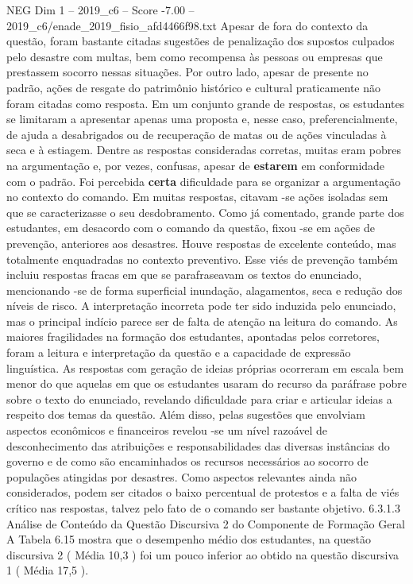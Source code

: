 \begin{textsample}{NEG Dim 1 – 2019\_c6 – Score -7.00 – 2019\_c6/enade\_2019\_fisio\_afd4466f98.txt}
Apesar de fora do contexto da questão, foram bastante citadas sugestões de penalização dos supostos culpados pelo desastre com multas, bem como recompensa às pessoas ou empresas que prestassem socorro nessas situações.
Por outro lado, apesar de presente no padrão, ações de resgate do patrimônio histórico e cultural praticamente não foram citadas como resposta.
Em um conjunto grande de respostas, os estudantes se limitaram a apresentar apenas uma proposta e, nesse caso, preferencialmente, de ajuda a desabrigados ou de recuperação de matas ou de ações vinculadas à seca e à estiagem.
Dentre as respostas consideradas corretas, muitas eram pobres na argumentação e, por vezes, confusas, apesar de \textbf{estarem} em conformidade com o padrão.
Foi percebida \textbf{certa} dificuldade para se organizar a argumentação no contexto do comando.
Em muitas respostas, citavam -se ações isoladas sem que se caracterizasse o seu desdobramento.
Como já comentado, grande parte dos estudantes, em desacordo com o comando da questão, fixou -se em ações de prevenção, anteriores aos desastres.
Houve respostas de excelente conteúdo, mas totalmente enquadradas no contexto preventivo.
Esse viés de prevenção também incluiu respostas fracas em que se parafraseavam os textos do enunciado, mencionando -se de forma superficial inundação, alagamentos, seca e redução dos níveis de risco.
A interpretação incorreta pode ter sido induzida pelo enunciado, mas o principal indício parece ser de falta de atenção na leitura do comando.
As maiores fragilidades na formação dos estudantes, apontadas pelos corretores, foram a leitura e interpretação da questão e a capacidade de expressão linguística.
As respostas com geração de ideias próprias ocorreram em escala bem menor do que aquelas em que os estudantes usaram do recurso da paráfrase pobre sobre o texto do enunciado, revelando dificuldade para criar e articular ideias a respeito dos temas da questão.
Além disso, pelas sugestões que envolviam aspectos econômicos e financeiros revelou -se um nível razoável de desconhecimento das atribuições e responsabilidades das diversas instâncias do governo e de como são encaminhados os recursos necessários ao socorro de populações atingidas por desastres.
Como aspectos relevantes ainda não considerados, podem ser citados o baixo percentual de protestos e a falta de viés crítico nas respostas, talvez pelo fato de o comando ser bastante objetivo. 6.3.1.3 Análise de Conteúdo da Questão Discursiva 2 do Componente de Formação Geral A Tabela 6.15 mostra que o desempenho médio dos estudantes, na questão discursiva 2 ( Média 10,3 ) foi um pouco inferior ao obtido na questão discursiva 1 ( Média 17,5 ).

\end{textsample}
